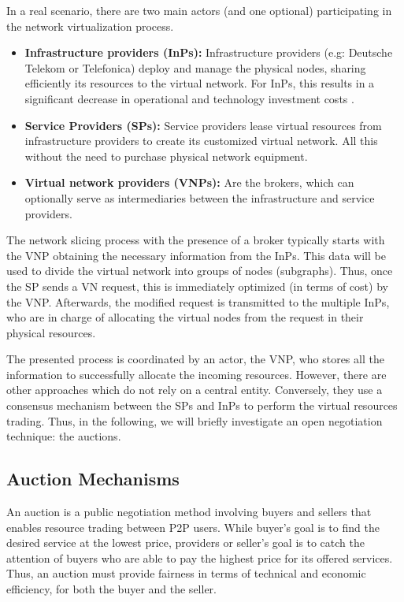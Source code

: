 In a real scenario, there are two main actors (and one optional) participating in the network virtualization process.

\begin{itemize}
	
	\item \textbf{Infrastructure providers (InPs):} Infrastructure providers (e.g: Deutsche Telekom or Telefonica) deploy and manage the physical nodes, sharing efficiently its resources to the virtual network. For InPs, this results in a significant decrease in operational and technology investment costs \citep{dietrich2015multi}.
	\item \textbf{Service Providers (SPs):} Service providers lease virtual resources from infrastructure providers to create its customized virtual network. All this without the need to purchase physical network equipment.
		\item \textbf{Virtual network providers (VNPs):} Are the brokers, which can optionally serve as intermediaries between the infrastructure and service providers.
\end{itemize}

The network slicing process with the presence of a broker typically starts with the VNP obtaining the necessary information from the InPs. This data will be used to divide the virtual network into groups of nodes (subgraphs). Thus, once the SP sends a VN request, this is immediately optimized (in terms of cost) by the VNP. Afterwards, the modified request is transmitted to the multiple InPs, who are in charge of allocating the virtual nodes from the request in their physical resources. 

The presented process is coordinated by an actor, the VNP, who stores all the information to successfully allocate the incoming resources. However, there are other approaches which do not rely on a central entity. Conversely, they use a consensus mechanism between the SPs and InPs to perform the virtual resources trading. Thus, in the following, we will briefly investigate an open negotiation technique: the auctions.

\subsection{Auction Mechanisms} 

An auction is a public negotiation method involving buyers and sellers that enables resource trading between P2P users. While buyer's goal is to find the desired service at the lowest price, providers or seller's goal is to catch the attention of buyers who are able to pay the highest price for its offered services. Thus, an auction must provide fairness in terms of technical and economic efficiency, for both the buyer and the seller.

